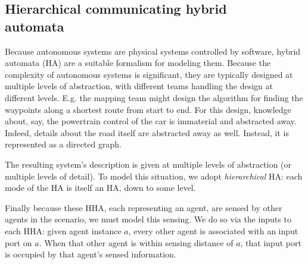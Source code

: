 \subsection{Hierarchical communicating hybrid \\automata}
\label{HCHA}
Because autonomous systems are physical systems controlled by software, hybrid automata (HA) are a suitable formalism for modeling them.
Because the complexity of autonomous systems is significant, they are typically designed at multiple levels of abstraction, 
with different teams handling the design at different levels.
E.g. the mapping team might design the algorithm for finding the waypoints along a shortest route from start to end.
For this design, knowledge about, say, the powertrain control of the car is immaterial and abstracted away.
Indeed, details about the road itself are abstracted away as well.
Instead, it is represented as a directed graph.

The resulting system's description is given at multiple levels of abstraction (or multiple levels of detail). 
To model this situation, we adopt \emph{hierarchical} HA: each mode of the HA is itself an HA, down to some level.

Finally because these HHA, each representing an agent, are sensed by other agents in the scenario, we must model this sensing. 
We do so via the inputs to each HHA: given agent instance $a$, every other agent is associated with an input port on $a$.
When that other agent is within sensing distance of $a$, that input port is occupied by that agent's sensed information.


